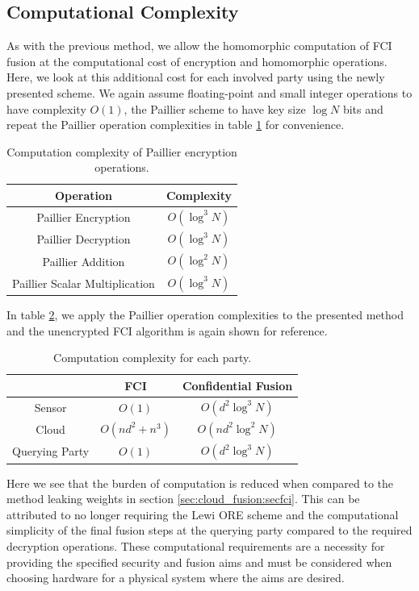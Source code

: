 \subsection{Computational Complexity}\label{subsec:cloud_fusion:secfci2_comp_complexity}
As with the previous method, we allow the homomorphic computation of FCI fusion at the computational cost of encryption and homomorphic operations. Here, we look at this additional cost for each involved party using the newly presented scheme. We again assume floating-point and small integer operations to have complexity $O(1)$, the Paillier scheme to have key size $\log{N}$ bits and repeat the Paillier operation complexities in table \ref{tab:cloud_fusion:secfci2_op_complexity} for convenience. 
\begin{table}[htbp]
    \centering
    \caption{Computation complexity of Paillier encryption operations.}
    \label{tab:cloud_fusion:secfci2_op_complexity}
    \begin{tabular}{|c|c|}
        \hline
        \textbf{Operation} & \textbf{Complexity} \\ 
        \hline
        Paillier Encryption & $O(\log^3{N})$ \\ 
        Paillier Decryption & $O(\log^3{N})$ \\ 
        Paillier Addition & $O(\log^2{N})$ \\ 
        Paillier Scalar Multiplication & $O(\log^3{N})$ \\ 
        \hline
    \end{tabular}
\end{table}
In table \ref{tab:cloud_fusion:secfci2_complexity}, we apply the Paillier operation complexities to the presented method and the unencrypted FCI algorithm is again shown for reference.
\begin{table}[htbp]
    \centering
    \caption{Computation complexity for each party.}
    \label{tab:cloud_fusion:secfci2_complexity}
    \begin{tabular}{|c|c|c|}
       \hline
        & \textbf{FCI} & \textbf{Confidential Fusion} \\ 
       \hline
       Sensor & $O(1)$ & $O\left(d^2\log^3{N}\right)$ \\ 
       Cloud & $O\left(nd^2 + n^3\right)$ & $O\left(nd^2\log^2{N}\right)$ \\ 
       Querying Party & $O(1)$ & $O\left(d^2\log^3{N}\right)$ \\ 
       \hline
    \end{tabular}
 \end{table}
Here we see that the burden of computation is reduced when compared to the method leaking weights in section \ref{sec:cloud_fusion:secfci}. This can be attributed to no longer requiring the Lewi ORE scheme and the computational simplicity of the final fusion steps at the querying party compared to the required decryption operations. These computational requirements are a necessity for providing the specified security and fusion aims and must be considered when choosing hardware for a physical system where the aims are desired.

